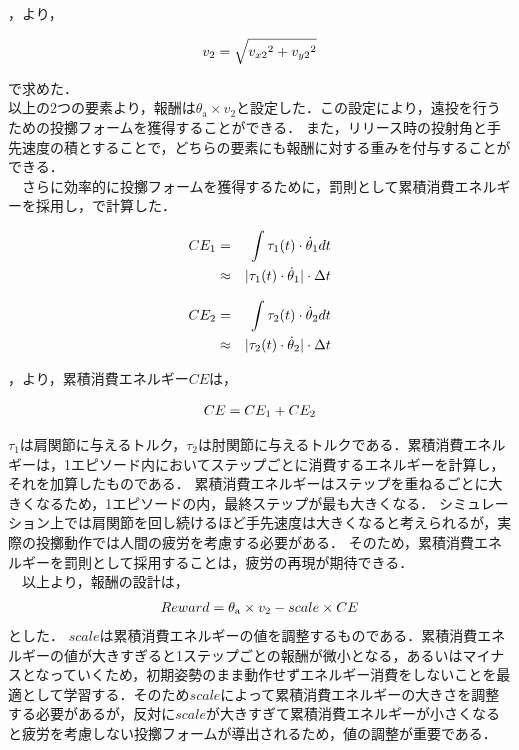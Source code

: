 ，より，

\begin{eqnarray}
  \equlabel{2.22}
  v_{2}=\sqrt{{v_{x2}}^2+{v_{y2}}^2}
\end{eqnarray}

で求めた．\\
以上の2つの要素より，報酬は$\theta_{\mathrm{a}} \times v_{2}$と設定した．この設定により，遠投を行うための投擲フォームを獲得することができる．
また，リリース時の投射角と手先速度の積とすることで，どちらの要素にも報酬に対する重みを付与することができる．\\
　さらに効率的に投擲フォームを獲得するために，罰則として累積消費エネルギーを採用し，で計算した．

\begin{eqnarray}
  \equlabel{2.23}
  CE_{1}&=&\int \tau_{1}(t)\cdot\dot{\theta}_{1} dt \nonumber \\
        &\approx&|\tau_{1}(t)\cdot\dot{\theta}_{1}|\cdot\Delta t
\end{eqnarray}

\begin{eqnarray}
  \equlabel{2.24}
  CE_{2}&=&\int \tau_{2}(t)\cdot\dot{\theta}_{2} dt \nonumber \\
        &\approx&|\tau_{2}(t)\cdot\dot{\theta}_{2}|\cdot\Delta t
\end{eqnarray}

，より，累積消費エネルギー$CE$は，

\begin{eqnarray}
  \equlabel{2.25}
  CE = CE_{1} + CE_{2}
\end{eqnarray}

$\tau_{1}$は肩関節に与えるトルク，$\tau_{2}$は肘関節に与えるトルクである．累積消費エネルギーは，1エピソード内においてステップごとに消費するエネルギーを計算し，それを加算したものである．
累積消費エネルギーはステップを重ねるごとに大きくなるため，1エピソードの内，最終ステップが最も大きくなる．
シミュレーション上では肩関節を回し続けるほど手先速度は大きくなると考えられるが，実際の投擲動作では人間の疲労を考慮する必要がある．
そのため，累積消費エネルギーを罰則として採用することは，疲労の再現が期待できる．\\
　以上より，報酬の設計は，
\begin{eqnarray}
  \equlabel{2.26}
  Reward = \theta_{\mathrm{a}} \times v_{2} - scale \times CE
\end{eqnarray}
とした．
$scale$は累積消費エネルギーの値を調整するものである．累積消費エネルギーの値が大きすぎると1ステップごとの報酬が微小となる，あるいはマイナスとなっていくため，初期姿勢のまま動作せずエネルギー消費をしないことを最適として学習する．そのため$scale$によって累積消費エネルギーの大きさを調整する必要があるが，反対に$scale$が大きすぎて累積消費エネルギーが小さくなると疲労を考慮しない投擲フォームが導出されるため，値の調整が重要である．
